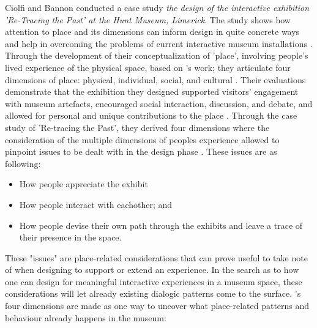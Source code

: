 Ciolfi and Bannon conducted a case study \emph{the design of the interactive exhibition 'Re-Tracing the Past' at the Hunt Museum, Limerick}. The study shows how attention to place and its dimensions can inform design in quite concrete ways and help in overcoming the problems of current interactive museum installations \autocite[p. 178]{hybridplace_ciolfi}. Through the development of their conceptualization of 'place', involving people's lived experience of the physical space, based on \autocite{Tuan_book}'s work; they articulate four dimensions of place: physical, individual, social, and cultural \autocite[p. 178]{hybridplace_ciolfi}. Their evaluations demonstrate that the exhibition they designed supported visitors' engagement with museum artefacts, encouraged social interaction, discussion, and debate, and allowed for personal and unique contributions to the place \autocite[p. 178]{hybridplace_ciolfi}. Through the case study of 'Re-tracing the Past', they derived four dimensions where the consideration of the multiple dimensions of peoples experience allowed to pinpoint issues to be dealt with in the design phase \autocite[p. 178]{hybridplace_ciolfi}. These issues are as following:

\begin{itemize}
    \item How people appreciate the exhibit
    \item How people interact with eachother; and
    \item How people devise their own path through the exhibits and leave a trace of their presence in the space.
\end{itemize}

These "issues" are place-related considerations that can prove useful to take note of when designing to support or extend an experience. In the search as to how one can design for meaningful interactive experiences in a museum space, these considerations will let already existing dialogic patterns come to the surface. \autocite{hybridplace_ciolfi}'s four dimensions are made as one way to uncover what place-related patterns and behaviour already happens in the museum:

